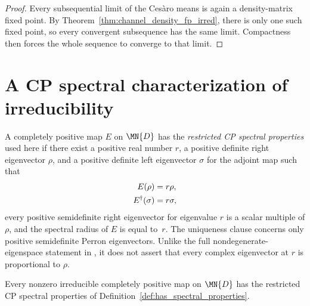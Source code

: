 \begin{proof}
    \leanok
    Every subsequential limit of the Ces\`aro means is again a density-matrix
    fixed point.
    By Theorem~\ref{thm:channel_density_fp_irred}, there is only one such
    fixed point, so every convergent subsequence has the same limit.
    Compactness then forces the whole sequence to converge to that limit.
\end{proof}

\section{A CP spectral characterization of irreducibility}

\begin{definition}
    \label{def:has_spectral_properties}
    \leanok
    A completely positive map $E$ on $\MN{D}$ has the \emph{restricted CP
        spectral properties} used here if there exist a positive real number $r$, a positive
    definite right eigenvector $\rho$, and a positive definite left eigenvector
    $\sigma$ for the adjoint map such that
    \begin{align}
        E(\rho)
         & =r\rho, \notag \\
        E^\dagger(\sigma)
         & =r\sigma,
        \label{eq:qpf_spectral_eigenvectors}
    \end{align}
    every positive semidefinite right eigenvector for eigenvalue $r$ is a
    scalar multiple of $\rho$, and the spectral radius of $E$ is equal to~$r$.
    The uniqueness clause concerns only positive semidefinite Perron
    eigenvectors. Unlike the full nondegenerate-eigenspace statement in
    \cite[Theorem~6.4]{Wolf2012Quantum}, it does not assert that every complex
    eigenvector at $r$ is proportional to $\rho$.
\end{definition}

\begin{theorem}
    \label{thm:has_spectral_properties_irred}
    \leanok
    Every nonzero irreducible completely positive map on $\MN{D}$ has the
    restricted CP spectral properties of Definition~\ref{def:has_spectral_properties}.
\end{theorem}


